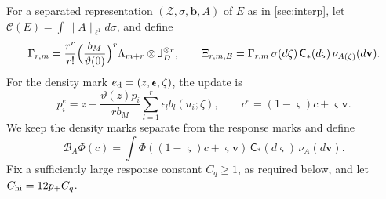 For a separated representation $(\mathcal Z,\sigma,\mathbf b,A)$ of $E$
as in \cref{sec:interp}, let
$\mathcal C(E)=\int\|A\|_{\ell^1}d\sigma$, and define
\begin{equation}\label{eq:LB-loc-packet}
 \Gamma_{r,m}=\frac{r^r}{r!}
 \Bigl(\frac{b_M}{\vartheta(0)}\Bigr)^r
 \Lambda_{m+r}\otimes\mathsf J_D^{\otimes r},\qquad
 \Xi_{r,m,E}=\Gamma_{r,m}\,\sigma(d\zeta)\,
                  \mathsf C_*(d\varsigma)\,\nu_{A(\zeta)}(d\mathbf v).
\end{equation}
For the density mark $e_{\rm d}=(z,\boldsymbol\epsilon,\zeta)$, the
update is
\begin{equation}\label{eq:LB-loc-update}
 p_i^e=z+\frac{\vartheta(z)p_i}{rb_M}
                    \sum_{l=1}^r\epsilon_l b_l(u_i;\zeta),\qquad
 c^e=(1-\varsigma)c+\varsigma\mathbf v.
\end{equation}
We keep the density marks separate from the response marks and
define
\begin{equation}\label{eq:LB-matrix-response}
 \mathcal B_A\Phi(c)=\int\Phi((1-\varsigma)c+\varsigma\mathbf v)
                     \,\mathsf C_*(d\varsigma)\,\nu_A(d\mathbf v).
\end{equation}
Fix a sufficiently large response constant $C_q\ge1$, as required
below, and let $C_{\rm hi}=12p_+C_q$.

